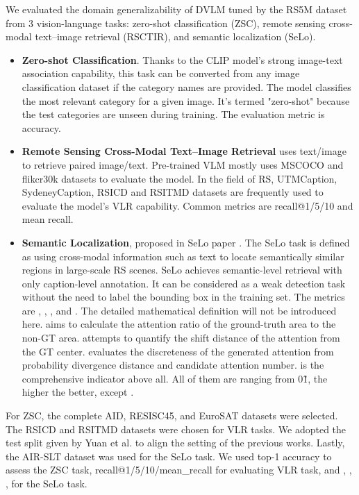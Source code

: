 \documentclass[journal]{IEEEtran}
\begin{document}
We evaluated the domain generalizability of DVLM tuned by the RS5M dataset from 3 vision-language tasks: zero-shot classification (ZSC), remote sensing cross-modal text–image retrieval (RSCTIR), and semantic localization (SeLo). 

\begin{itemize}
    \item \textbf{Zero-shot Classification}. Thanks to the CLIP \cite{clip} model's strong image-text association capability, this task can be converted from any image classification dataset if the category names are provided. The model classifies the most relevant category for a given image. It's termed "zero-shot" because the test categories are unseen during training. The evaluation metric is accuracy.
    \item \textbf{Remote Sensing Cross-Modal Text–Image Retrieval} uses text/image to retrieve paired image/text. Pre-trained VLM mostly uses MSCOCO and flikcr30k datasets to evaluate the model. In the field of RS, UTMCaption, SydeneyCaption, RSICD and RSITMD datasets are frequently used to evaluate the model's VLR capability. Common metrics are recall@1/5/10 and mean recall.
     \item \textbf{Semantic Localization}, proposed in SeLo paper \cite{selo}. The SeLo task is defined as using cross-modal information such as text to locate semantically similar regions in large-scale RS scenes. SeLo achieves semantic-level retrieval with only caption-level annotation. It can be considered as a weak detection task without the need to label the bounding box in the training set. The metrics are , , , and . The detailed mathematical definition will not be introduced here.  aims to calculate the attention ratio of the ground-truth area to the non-GT area.  attempts to quantify the shift distance of the attention from the GT center.  evaluates the discreteness of the generated attention from probability divergence distance and candidate attention number.  is the comprehensive indicator above all. All of them are ranging from 0\~1, the higher the better, except .
\end{itemize}

For ZSC, the complete AID\cite{aid}, RESISC45\cite{RESISC45}, and EuroSAT\cite{eurosat} datasets were selected. The RSICD and RSITMD datasets were chosen for VLR tasks. We adopted the test split given by Yuan et al. \cite{RSITMD} to align the setting of the previous works. Lastly, the AIR-SLT dataset was used for the SeLo task. We used top-1 accuracy to assess the ZSC task, recall@1/5/10/mean\_recall for evaluating VLR task, and , , ,  for the SeLo task. 
\end{document}
